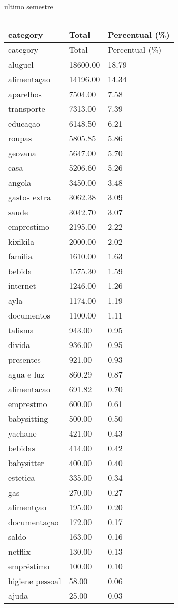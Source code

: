 \documentclass[
  8pt,
  a4paper,
  DIV=11,
  numbers=noendperiod]{scrartcl}
\begin{document}
\begin{figure}
\begin{minipage}{0.50\linewidth}
\end{minipage}%
%
\begin{minipage}{0.50\linewidth}
ultimo semestre

\begin{longtable}[]{@{}lll@{}}
\caption{}\label{T_12c82}\tabularnewline
\toprule\noalign{}
category & Total & Percentual (\%) \\
\midrule\noalign{}
\endfirsthead
\toprule\noalign{}
category & Total & Percentual (\%) \\
\midrule\noalign{}
\endhead
\bottomrule\noalign{}
\endlastfoot
aluguel & 18600.00 & 18.79 \\
alimentaçao & 14196.00 & 14.34 \\
aparelhos & 7504.00 & 7.58 \\
transporte & 7313.00 & 7.39 \\
educaçao & 6148.50 & 6.21 \\
roupas & 5805.85 & 5.86 \\
geovana & 5647.00 & 5.70 \\
casa & 5206.60 & 5.26 \\
angola & 3450.00 & 3.48 \\
gastos extra & 3062.38 & 3.09 \\
saude & 3042.70 & 3.07 \\
emprestimo & 2195.00 & 2.22 \\
kixikila & 2000.00 & 2.02 \\
familia & 1610.00 & 1.63 \\
bebida & 1575.30 & 1.59 \\
internet & 1246.00 & 1.26 \\
ayla & 1174.00 & 1.19 \\
documentos & 1100.00 & 1.11 \\
talisma & 943.00 & 0.95 \\
divida & 936.00 & 0.95 \\
presentes & 921.00 & 0.93 \\
agua e luz & 860.29 & 0.87 \\
alimentacao & 691.82 & 0.70 \\
emprestmo & 600.00 & 0.61 \\
babysitting & 500.00 & 0.50 \\
yachane & 421.00 & 0.43 \\
bebidas & 414.00 & 0.42 \\
babysitter & 400.00 & 0.40 \\
estetica & 335.00 & 0.34 \\
gas & 270.00 & 0.27 \\
alimentçao & 195.00 & 0.20 \\
documentaçao & 172.00 & 0.17 \\
saldo & 163.00 & 0.16 \\
netflix & 130.00 & 0.13 \\
empréstimo & 100.00 & 0.10 \\
higiene pessoal & 58.00 & 0.06 \\
ajuda & 25.00 & 0.03 \\
\end{longtable}


\end{minipage}
\end{figure}
\end{document}
